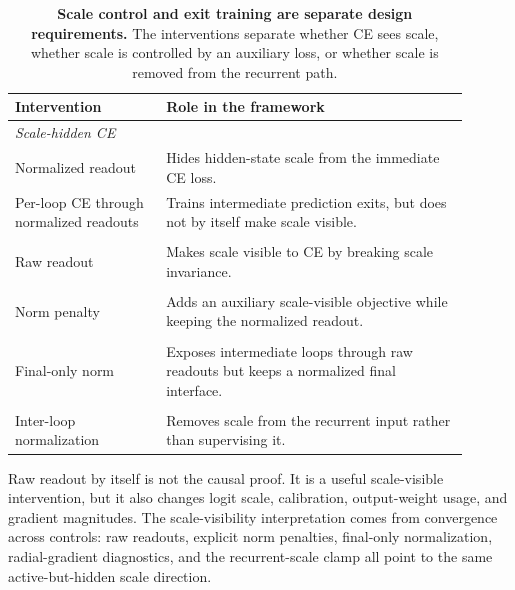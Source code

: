 \begin{table}[t]
\centering
\small
\caption{\textbf{Scale control and exit training are separate design requirements.} The interventions separate whether CE sees scale, whether scale is controlled by an auxiliary loss, or whether scale is removed from the recurrent path.}
\label{tab:interventions-main}
\begin{tabular}{p{0.30\linewidth}p{0.60\linewidth}}
\toprule
\textbf{Intervention} & \textbf{Role in the framework} \\
\midrule
\multicolumn{2}{l}{\emph{Scale-hidden CE}} \\
Normalized readout & Hides hidden-state scale from the immediate CE loss. \\
Per-loop CE through normalized readouts & Trains intermediate prediction exits, but does not by itself make scale visible. \\
\addlinespace
\multicolumn{2}{l}{\emph{Scale-visible CE}} \\
Raw readout & Makes scale visible to CE by breaking scale invariance. \\
\addlinespace
\multicolumn{2}{l}{\emph{Explicit scale penalty}} \\
Norm penalty & Adds an auxiliary scale-visible objective while keeping the normalized readout. \\
\addlinespace
\multicolumn{2}{l}{\emph{Hybrid readout}} \\
Final-only norm & Exposes intermediate loops through raw readouts but keeps a normalized final interface. \\
\addlinespace
\multicolumn{2}{l}{\emph{Scale-removing recurrence}} \\
Inter-loop normalization & Removes scale from the recurrent input rather than supervising it. \\
\bottomrule
\end{tabular}
\end{table}

Raw readout by itself is not the causal proof.
It is a useful scale-visible intervention, but it also changes logit scale, calibration, output-weight usage, and gradient magnitudes.
The scale-visibility interpretation comes from convergence across controls: raw readouts, explicit norm penalties, final-only normalization, radial-gradient diagnostics, and the recurrent-scale clamp all point to the same active-but-hidden scale direction.
